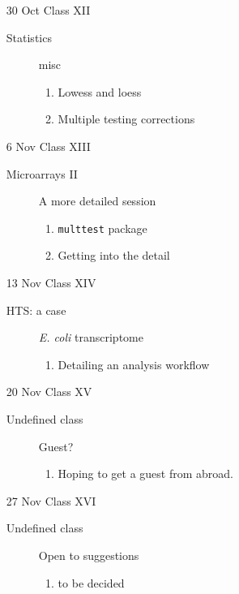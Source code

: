 \documentclass[letterpaper,12pt]{article}
\newcommand{\pl}[1]{\texttt{#1}}
\begin{document}
\begin{itemize}
  \item[30 Oct] Class XII
  \begin{description}
  \item[Statistics] misc
  \begin{enumerate}
  \item Lowess and loess
  \item Multiple testing corrections
  \end{enumerate}
  \end{description}
  
  \item[6 Nov] Class XIII
  \begin{description}
  \item[Microarrays II] A more detailed session
  \begin{enumerate}
  \item \pl{multtest} package
  \item Getting into the detail
  \end{enumerate}
  \end{description}  
    
  \item[13 Nov] Class XIV
  \begin{description}
  \item[HTS: a case] \emph{E. coli} transcriptome
  \begin{enumerate}
  \item Detailing an analysis workflow
  \end{enumerate}
  \end{description}
  
  \item[20 Nov] Class XV
  \begin{description}
  \item[Undefined class] Guest?
  \begin{enumerate}
  \item Hoping to get a guest from abroad.
  \end{enumerate}
  \end{description}
    
  \item[27 Nov] Class XVI
  \begin{description}
  \item[Undefined class] Open to suggestions
  \begin{enumerate}
  \item to be decided
  \end{enumerate}
  \end{description}
  

\end{itemize}
\end{document}
